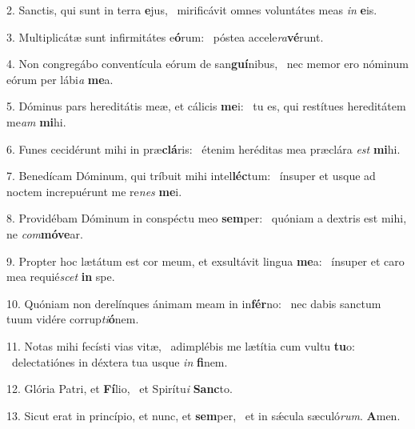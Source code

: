 2. Sanctis, qui sunt in terra \textbf{e}jus, \ast\  mirificávit omnes voluntátes meas \textit{in} \textbf{e}is.\

3. Multiplicátæ sunt infirmitátes e\textbf{ó}rum: \ast\  póstea accele\textit{ra}\textbf{vé}runt.\

4. Non congregábo conventícula eórum de san\textbf{guí}nibus, \ast\  nec memor ero nóminum eórum per lábi\textit{a} \textbf{me}a.\

5. Dóminus pars hereditátis meæ, et cálicis \textbf{me}i: \ast\  tu es, qui restítues hereditátem me\textit{am} \textbf{mi}hi.\

6. Funes cecidérunt mihi in præ\textbf{clá}ris: \ast\  étenim heréditas mea præclára \textit{est} \textbf{mi}hi.\

7. Benedícam Dóminum, qui tríbuit mihi intel\textbf{léc}tum: \ast\  ínsuper et usque ad noctem increpuérunt me re\textit{nes} \textbf{me}i.\

8. Providébam Dóminum in conspéctu meo \textbf{sem}per: \ast\  quóniam a dextris est mihi, ne \textit{com}\textbf{mó}\textbf{ve}ar.\

9. Propter hoc lætátum est cor meum, et exsultávit lingua \textbf{me}a: \ast\  ínsuper et caro mea requié\textit{scet} \textbf{in} spe.\

10. Quóniam non derelínques ánimam meam in in\textbf{fér}no: \ast\  nec dabis sanctum tuum vidére corrup\textit{ti}\textbf{ó}nem.\

11. Notas mihi fecísti vias vitæ, \dag\  adimplébis me lætítia cum vultu \textbf{tu}o: \ast\  delectatiónes in déxtera tua usque \textit{in} \textbf{fi}nem.\

12. Glória Patri, et \textbf{Fí}lio, \ast\  et Spirítu\textit{i} \textbf{Sanc}to.\

13. Sicut erat in princípio, et nunc, et \textbf{sem}per, \ast\  et in sǽcula sæculó\textit{rum}. \textbf{A}men.\

